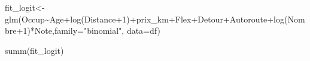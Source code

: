 \documentclass[
]{book}
\newenvironment{Shaded}{\begin{snugshade}}{\end{snugshade}}
\newcommand{\AttributeTok}[1]{\textcolor[rgb]{0.77,0.63,0.00}{#1}}
\newcommand{\DecValTok}[1]{\textcolor[rgb]{0.00,0.00,0.81}{#1}}
\newcommand{\FunctionTok}[1]{\textcolor[rgb]{0.00,0.00,0.00}{#1}}
\newcommand{\NormalTok}[1]{#1}
\newcommand{\OtherTok}[1]{\textcolor[rgb]{0.56,0.35,0.01}{#1}}
\newcommand{\SpecialCharTok}[1]{\textcolor[rgb]{0.00,0.00,0.00}{#1}}
\newcommand{\StringTok}[1]{\textcolor[rgb]{0.31,0.60,0.02}{#1}}
\begin{document}
\begin{Shaded}
\begin{Highlighting}[]
\NormalTok{fit\_logit}\OtherTok{\textless{}{-}}\FunctionTok{glm}\NormalTok{(Occup}\SpecialCharTok{\textasciitilde{}}\NormalTok{Age}\SpecialCharTok{+}\FunctionTok{log}\NormalTok{(Distance}\SpecialCharTok{+}\DecValTok{1}\NormalTok{)}\SpecialCharTok{+}\NormalTok{prix\_km}\SpecialCharTok{+}\NormalTok{Flex}\SpecialCharTok{+}\NormalTok{Detour}\SpecialCharTok{+}\NormalTok{Autoroute}\SpecialCharTok{+}\FunctionTok{log}\NormalTok{(Nombre}\SpecialCharTok{+}\DecValTok{1}\NormalTok{)}\SpecialCharTok{*}\NormalTok{Note,}\AttributeTok{family=}\StringTok{"binomial"}\NormalTok{, }\AttributeTok{data=}\NormalTok{df)}

\FunctionTok{summ}\NormalTok{(fit\_logit)}
\end{Highlighting}
\end{Shaded}
\end{document}
